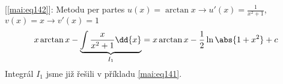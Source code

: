   [\ref{mai:eq142}]: Metodu per partes \(u(x) =\arctan x \rightarrow u'(x) =\frac{1}{x^2+1}\),
  \(v(x)= x \rightarrow v'(x) = 1\)      
  \begin{gather*}
    x\arctan x-\underbrace{\int\frac{x}{x^2+1}\dd{x}}_{I_1} =
    x\arctan x-\frac{1}{2}\ln\abs{1+x^2}+ c 
  \end{gather*}
  Integrál \(I_1\) jsme již řešili v příkladu \ref{mai:eq141}.